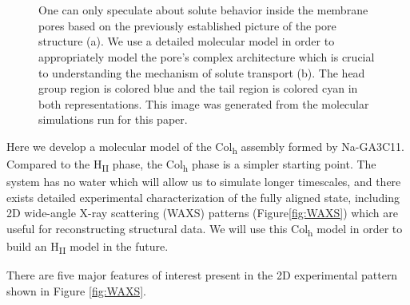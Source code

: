 \documentclass[journal=jpcbfk,manusciprt=article]{achemso}
\begin{document}
\begin{figure}
\begin{subfigure}{0.45\linewidth}
		\caption{}~\label{fig:detailed_pore}
	\end{subfigure}
    \caption{One can only speculate about solute behavior inside the membrane
	  pores based on the previously established picture of the pore structure (a). 
      We use a detailed molecular model in order to appropriately model the pore's
      complex architecture which is crucial to understanding the mechanism of solute
	  transport (b). The head group region is colored blue and the tail region is
	  colored cyan in both representations. This image was generated from the molecular
	  simulations run for this paper.}~\label{fig:detail}
  \end{figure}
 
  Here we develop a molecular model of the Col\textsubscript{h} assembly formed by
  Na-GA3C11. Compared to the H\textsubscript{II} phase, the Col\textsubscript{h}
  phase is a simpler starting point. The system has no water which will allow us
  to simulate longer timescales, and there exists detailed experimental
  characterization of the fully aligned state, including 2D wide-angle X-ray
  scattering (WAXS) patterns (Figure\ref{fig:WAXS}) which are useful for reconstructing 
  structural data. We will use this Col\textsubscript{h} model in order to build an 
  H\textsubscript{II} model in the future.
  
  There are five major features of interest present in the 2D experimental pattern shown 
  in Figure \ref{fig:WAXS}.
\end{document}
